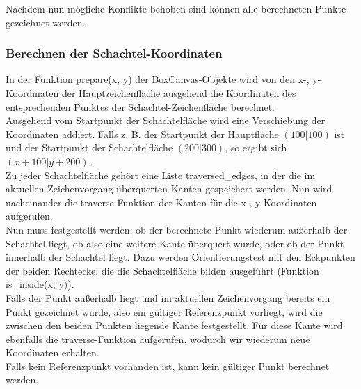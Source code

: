 Nachdem nun mögliche Konflikte behoben sind können alle berechneten Punkte gezeichnet werden.\\


\subsubsection{Berechnen der Schachtel-Koordinaten}
\label{subsubsec:schachtelkoordinaten}

In der Funktion prepare(x, y) der BoxCanvas-Objekte wird von den x-, y-Koordinaten der Hauptzeichenfläche ausgehend die Koordinaten des entsprechenden Punktes der Schachtel-Zeichenfläche berechnet.\\

Ausgehend vom Startpunkt der Schachtelfläche wird eine Verschiebung der Koordinaten addiert. Falls z. B. der Startpunkt der Hauptfläche $(100|100)$ ist und der Startpunkt der Schachtelfläche $(200|300)$, so ergibt sich $(x+100|y+200)$.\\

Zu jeder Schachtelfläche gehört eine Liste traversed\_edges, in der die im aktuellen Zeichenvorgang überquerten Kanten gespeichert werden. Nun wird nacheinander die traverse-Funktion der Kanten für die x-, y-Koordinaten aufgerufen.\\

Nun muss festgestellt werden, ob der berechnete Punkt wiederum außerhalb der Schachtel liegt, ob also eine weitere Kante überquert wurde, oder ob der Punkt innerhalb der Schachtel liegt. Dazu werden Orientierungstest mit den Eckpunkten der beiden Rechtecke, die die Schachtelfläche bilden ausgeführt (Funktion is\_inside(x, y)).\\

Falls der Punkt außerhalb liegt und im aktuellen Zeichenvorgang bereits ein Punkt gezeichnet wurde, also ein gültiger Referenzpunkt vorliegt, wird die zwischen den beiden Punkten liegende Kante festgestellt. Für diese Kante wird ebenfalls die traverse-Funktion aufgerufen, wodurch wir wiederum neue Koordinaten erhalten.\\

Falls kein Referenzpunkt vorhanden ist, kann kein gültiger Punkt berechnet werden.\\

